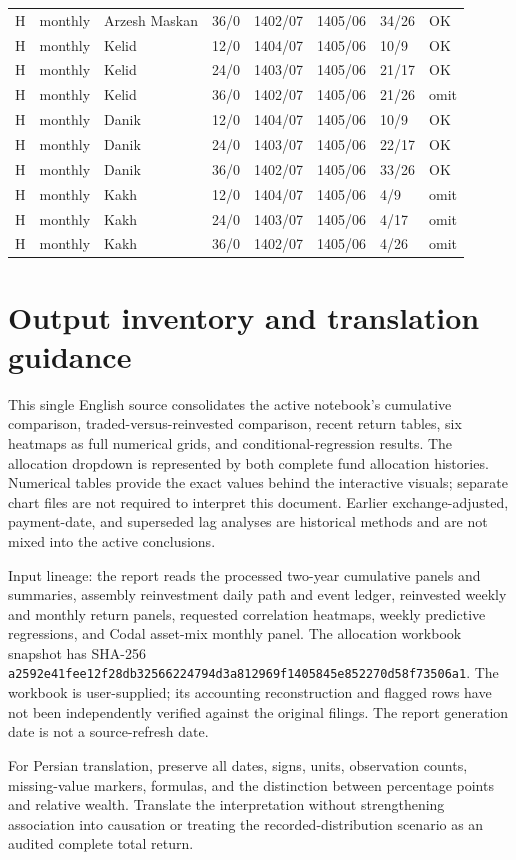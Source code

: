 \documentclass[11pt,a4paper]{article}
\begin{document}
\begin{longtable}{llllllll}
H & monthly & Arzesh Maskan & 36/0 & 1402/07 & 1405/06 & 34/26 & OK \\
H & monthly & Kelid & 12/0 & 1404/07 & 1405/06 & 10/9 & OK \\
H & monthly & Kelid & 24/0 & 1403/07 & 1405/06 & 21/17 & OK \\
H & monthly & Kelid & 36/0 & 1402/07 & 1405/06 & 21/26 & omit \\
H & monthly & Danik & 12/0 & 1404/07 & 1405/06 & 10/9 & OK \\
H & monthly & Danik & 24/0 & 1403/07 & 1405/06 & 22/17 & OK \\
H & monthly & Danik & 36/0 & 1402/07 & 1405/06 & 33/26 & OK \\
H & monthly & Kakh & 12/0 & 1404/07 & 1405/06 & 4/9 & omit \\
H & monthly & Kakh & 24/0 & 1403/07 & 1405/06 & 4/17 & omit \\
H & monthly & Kakh & 36/0 & 1402/07 & 1405/06 & 4/26 & omit \\
\bottomrule\end{longtable}\endgroup

\section{Output inventory and translation guidance}

This single English source consolidates the active notebook's cumulative comparison, traded-versus-reinvested comparison, recent return tables, six heatmaps as full numerical grids, and conditional-regression results. The allocation dropdown is represented by both complete fund allocation histories. Numerical tables provide the exact values behind the interactive visuals; separate chart files are not required to interpret this document. Earlier exchange-adjusted, payment-date, and superseded lag analyses are historical methods and are not mixed into the active conclusions.

Input lineage: the report reads the processed two-year cumulative panels and summaries, assembly reinvestment daily path and event ledger, reinvested weekly and monthly return panels, requested correlation heatmaps, weekly predictive regressions, and Codal asset-mix monthly panel. The allocation workbook snapshot has SHA-256 \texttt{a2592e41fee12f28db32566224794d3a8129}\allowbreak\texttt{69f1405845e852270d58f73506a1}. The workbook is user-supplied; its accounting reconstruction and flagged rows have not been independently verified against the original filings. The report generation date is not a source-refresh date.

For Persian translation, preserve all dates, signs, units, observation counts, missing-value markers, formulas, and the distinction between percentage points and relative wealth. Translate the interpretation without strengthening association into causation or treating the recorded-distribution scenario as an audited complete total return.
\end{document}
